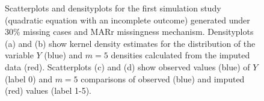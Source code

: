 \documentclass[12pt, fullpage, a4paper]{article}
\begin{document}
\begin{figure}[t]
\begin{center}
{{			}
		}
	\end{center}
	\caption{Scatterplots and densityplots for the first simulation study (quadratic equation with an incomplete outcome) generated under 30\% missing cases and MARr missingness mechanism. Densityplots (a) and (b) show kernel density estimates for the distribution of the variable $Y$ (blue) and $m = 5$ densities calculated from the imputed data (red). Scatterplots (c) and (d) show observed values (blue) of $Y$ (label 0) and $m = 5$ comparisons of observed (blue) and imputed (red) values (label 1-5).}
	\label{fig6_3}
\end{figure}
\end{document}
